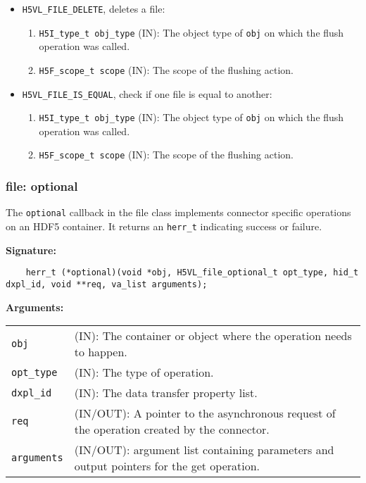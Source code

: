 \begin{mdframed}[style=bgbox]
\begin{itemize}
\item \texttt{H5VL\_FILE\_DELETE}, deletes a file:
  \begin{enumerate}
  \item \texttt{H5I\_type\_t obj\_type} (IN): The object type of \texttt{obj} on which the flush operation was called.
  \item \texttt{H5F\_scope\_t scope} (IN): The scope of the flushing action.
  \end{enumerate}

\item \texttt{H5VL\_FILE\_IS\_EQUAL}, check if one file is equal to another:
  \begin{enumerate}
  \item \texttt{H5I\_type\_t obj\_type} (IN): The object type of \texttt{obj} on which the flush operation was called.
  \item \texttt{H5F\_scope\_t scope} (IN): The scope of the flushing action.
  \end{enumerate}

 \end{itemize}
\end{mdframed}

\subsubsection{file: optional}
The \texttt{optional} callback in the file class implements connector specific operations on an HDF5 container. It returns an 
\texttt{herr\_t} indicating success or failure. \bigskip
\begin{mdframed}[style=bgbox] 
\textbf{Signature:}
\begin{lstlisting}
    herr_t (*optional)(void *obj, H5VL_file_optional_t opt_type, hid_t dxpl_id, void **req, va_list arguments);
\end{lstlisting}

\textbf{Arguments:}\\
\begin{tabular}{l p{13.5cm}}
  \texttt{obj} & (IN): The container or object where the operation needs to happen.\\
  \texttt{opt\_type} & (IN): The type of operation.\\
  \texttt{dxpl\_id} & (IN): The data transfer property list.\\
  \texttt{req} & (IN/OUT): A pointer to the asynchronous request of the operation created by the connector.\\
  \texttt{arguments} & (IN/OUT): argument list containing parameters and output pointers for the get operation. \\
\end{tabular}
\end{mdframed}

